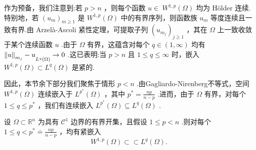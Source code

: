 作为预备，我们注意到:若 $p > n$ ，则每个函数 $u \in \; {W}^{1,p}\left( \Omega \right)$ 均为 Hölder 连续.特别地，若 ${\left( {u}_{m}\right) }_{m \geq  1}$ 是 ${W}^{1,p}\left( \Omega \right)$ 中的有界序列，则函数族 ${u}_{m}$ 等度连续且一致有界.由 Arzelà-Ascoli 紧性定理，可提取子列 ${\left( {u}_{{m}_{j}}\right) }_{j \geq  1}$ ，其在 $\Omega$ 上一致收敛于某个连续函数 $u$ .由于 $\Omega$ 有界，这蕴含对每个 $q \in  \left(  {1,\infty }\right)$ 均有 ${\norm{u}_{{m}_{j}} - u}_{{L}^{q}\left( \Omega \right) } \rightarrow  0$ .这已表明:当 $p > n$ 且 $1 \leq  q \leq  \infty$ 时，嵌入 ${W}^{1,p}\left( \Omega \right)  \subset  {L}^{q}\left( \Omega \right)$ 是紧的.

因此，本节余下部分我们聚焦于情形 $p < n$ .由Gagliardo-Nirenberg不等式，空间 ${W}^{1,p}\left( \Omega \right)$ 连续嵌入于 ${L}^{{p}^{ * }}\left( \Omega \right)$ ，其中 ${p}^{ * } = \frac{np}{n - p}$ .进而，由于 $\Omega$ 有界，对每个 $1 \leq  q \leq  {p}^{ * }$ ，我们有连续嵌入 ${L}^{{p}^{ * }}\left( \Omega \right)  \subseteq  {L}^{q}\left( \Omega \right)$ .

\begin{theorem}\label{thm:rellich-kondrachov}
设 $\Omega  \subset  {\mathbb{R}}^{n}$ 为具有 ${\mathcal{C}}^{1}$ 边界的有界开集，且假设 $1 \leq  p < n$ .则对每个 $1 \leq  q < {p}^{ * } \doteq  \frac{np}{n - p}$ ，均有紧嵌入
\begin{equation}\tag{8.71}\label{eq:rellich-kondrachov}
{W}^{1,p}\left( \Omega \right)  \subset  \subset  {L}^{q}\left( \Omega \right) .
\end{equation}
\end{theorem}

